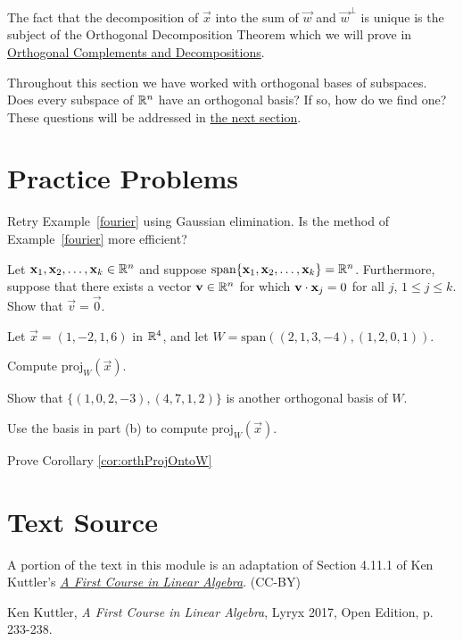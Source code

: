 \documentclass{ximera}
\begin{document}
The fact that the decomposition of $\vec{x}$ into the sum of $\vec{w}$ and $\vec{w}^\perp$ is unique is the subject of the Orthogonal Decomposition Theorem which we will prove in \href{https://ximera.osu.edu/oerlinalg/LinearAlgebra/RTH-0020/main}{Orthogonal Complements and Decompositions}.

Throughout this section we have worked with orthogonal bases of subspaces.  Does every subspace of $\mathbb{R}^n$ have an orthogonal basis?  If so, how do we find one?  These questions will be addressed in \href{https://ximera.osu.edu/oerlinalg/LinearAlgebra/RTH-0015/main}{the next section}.

\section*{Practice Problems}
\begin{problem}\label{prob:rref_way}
Retry Example~\ref{fourier} using Gaussian elimination.  Is the method of Example~\ref{fourier} more efficient?
\end{problem}
\begin{problem}\label{prob:vec_eq_0}
    Let $\mathbf{x}_1, \mathbf{x}_2, \ldots, \mathbf{x}_k\in\mathbb{R}^n$ and
suppose $\mbox{span}\{\mathbf{x}_1, \mathbf{x}_2, \ldots, \mathbf{x}_k\}=\mathbb{R}^n$.
Furthermore, suppose that there exists a vector $\mathbf{v}\in\mathbb{R}^n$ for which $\mathbf{v}\cdot \mathbf{x}_j=0$ for all $j$, $1\leq j\leq k$.
Show that $\vec{v}=\vec{0}$.
\end{problem}

\begin{problem}
Let $\vec{x} = (1, -2, 1, 6)$ in $\mathbb{R}^4$, and let $W = \mbox{span}\left((2, 1, 3, -4), (1, 2, 0, 1)\right)$.
\begin{problem}\label{OrthoProj1.1}
Compute $\mbox{proj}_W(\vec{x})$.
\end{problem}

\begin{problem}\label{OrthoProj1.2}
Show that $\{(1, 0, 2, -3), (4, 7, 1, 2)\}$ is another orthogonal basis of $W$.
\end{problem}

\begin{problem}\label{OrthoProj1.3}
Use the basis in part (b) to compute $\mbox{proj}_W(\vec{x})$.
\end{problem}

\end{problem}
\begin{problem}\label{prob:proofCor}
Prove Corollary \ref{cor:orthProjOntoW}
\end{problem}
  
\section*{Text Source}
A portion of the text in this module is an adaptation of Section 4.11.1 of Ken Kuttler's \href{https://open.umn.edu/opentextbooks/textbooks/a-first-course-in-linear-algebra-2017}{\it A First Course in Linear Algebra}. (CC-BY)

Ken Kuttler, {\it  A First Course in Linear Algebra}, Lyryx 2017, Open Edition, p. 233-238.  
\end{document}
